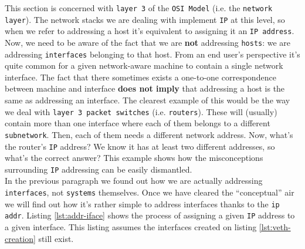         This section is concerned with \texttt{layer 3} of the \texttt{OSI Model} (i.e. the \texttt{network layer}). The network stacks we are dealing with implement \texttt{IP} at this level, so when we refer to addressing a host it's equivalent to assigning it an \texttt{IP address}. Now, we need to be aware of the fact that we are \textbf{not} addressing \texttt{hosts}: we are addressing \texttt{interfaces} belonging to that host. From an end user's perspective it's quite common for a given network-aware machine to contain a single network interface. The fact that there sometimes exists a one-to-one correspondence between machine and interface \textbf{does not imply} that addressing a host is the same as addressing an interface. The clearest example of this would be the way we deal with \texttt{layer 3 packet switches} (i.e. \texttt{routers}). These will (usually) contain more than one interface where each of them belongs to a different \texttt{subnetwork}. Then, each of them needs a different network address. Now, what's the router's \texttt{IP} address? We know it has at least two different addresses, so what's the correct answer? This example shows how the misconceptions surrounding \texttt{IP} addressing can be easily dismantled.\\

        In the previous paragraph we found out how we are actually addressing \texttt{interfaces}, not \texttt{systems} themselves. Once we have cleared the ``conceptual'' air we will find out how it's rather simple to address interfaces thanks to the \texttt{ip addr}. Listing \ref{lst:addr-iface} shows the process of assigning a given \texttt{IP} address to a given interface. This listing assumes the interfaces created on listing \ref{lst:veth-creation} still exist.\\

